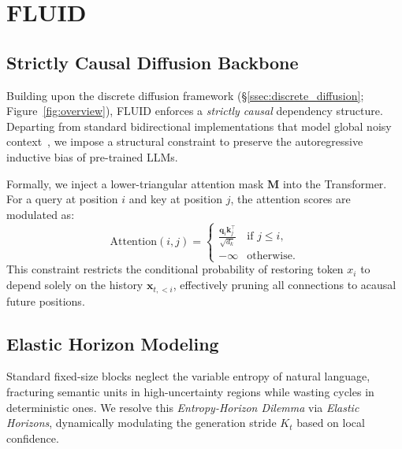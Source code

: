 \documentclass[11pt]{article}
\begin{document}
\section{FLUID}
\label{sec:method}
\subsection{Strictly Causal Diffusion Backbone}
\label{ssec:causal_realignment}

Building upon the discrete diffusion framework (\S\ref{ssec:discrete_diffusion}; Figure~\ref{fig:overview}), FLUID enforces a \textit{strictly causal} dependency structure. Departing from standard bidirectional implementations that model global noisy context~\citep{ye2025dream,nie2024scaling}, we impose a structural constraint to preserve the autoregressive inductive bias of pre-trained LLMs.

Formally, we inject a lower-triangular attention mask $\mathbf{M}$ into the Transformer. For a query at position $i$ and key at position $j$, the attention scores are modulated as:
\begin{equation}
    \text{Attention}(i, j) = 
    \begin{cases} 
    \frac{\mathbf{q}_i \mathbf{k}_j^\top}{\sqrt{d_k}} & \text{if } j \le i, \\
    -\infty & \text{otherwise}.
    \end{cases}
    \label{eq:causal_mask}
\end{equation}
This constraint restricts the conditional probability of restoring token $x_i$ to depend solely on the history $\mathbf{x}_{t,<i}$, effectively pruning all connections to acausal future positions.



\subsection{Elastic Horizon Modeling}
\label{ssec:elastic_horizon}

Standard fixed-size blocks neglect the variable entropy of natural language, fracturing semantic units in high-uncertainty regions while wasting cycles in deterministic ones. We resolve this \textit{Entropy-Horizon Dilemma} via \textit{Elastic Horizons}, dynamically modulating the generation stride $K_t$ based on local confidence.
\end{document}
